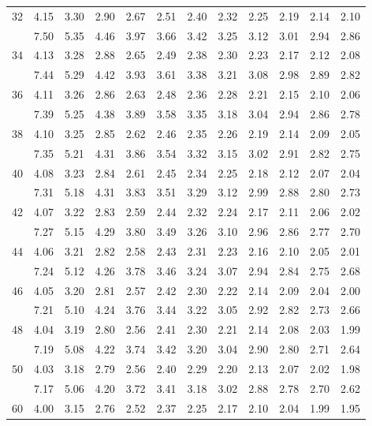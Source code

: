 \documentclass[lang=cn,10pt]{elegantbook}
\begin{document}
\begin{longtable}{c|ccccccccccc}
    32 & 4.15 & 3.30 & 2.90 & 2.67 & 2.51 & 2.40 & 2.32 & 2.25 & 2.19 & 2.14 & 2.10 \\
       & 7.50 & 5.35 & 4.46 & 3.97 & 3.66 & 3.42 & 3.25 & 3.12 & 3.01 & 2.94 & 2.86 \\
    34 & 4.13 & 3.28 & 2.88 & 2.65 & 2.49 & 2.38 & 2.30 & 2.23 & 2.17 & 2.12 & 2.08 \\
       & 7.44 & 5.29 & 4.42 & 3.93 & 3.61 & 3.38 & 3.21 & 3.08 & 2.98 & 2.89 & 2.82 \\
    36 & 4.11 & 3.26 & 2.86 & 2.63 & 2.48 & 2.36 & 2.28 & 2.21 & 2.15 & 2.10 & 2.06 \\
       & 7.39 & 5.25 & 4.38 & 3.89 & 3.58 & 3.35 & 3.18 & 3.04 & 2.94 & 2.86 & 2.78 \\
    38 & 4.10 & 3.25 & 2.85 & 2.62 & 2.46 & 2.35 & 2.26 & 2.19 & 2.14 & 2.09 & 2.05 \\
       & 7.35 & 5.21 & 4.31 & 3.86 & 3.54 & 3.32 & 3.15 & 3.02 & 2.91 & 2.82 & 2.75 \\
    40 & 4.08 & 3.23 & 2.84 & 2.61 & 2.45 & 2.34 & 2.25 & 2.18 & 2.12 & 2.07 & 2.04 \\
       & 7.31 & 5.18 & 4.31 & 3.83 & 3.51 & 3.29 & 3.12 & 2.99 & 2.88 & 2.80 & 2.73 \\
    42 & 4.07 & 3.22 & 2.83 & 2.59 & 2.44 & 2.32 & 2.24 & 2.17 & 2.11 & 2.06 & 2.02 \\
       & 7.27 & 5.15 & 4.29 & 3.80 & 3.49 & 3.26 & 3.10 & 2.96 & 2.86 & 2.77 & 2.70 \\
    44 & 4.06 & 3.21 & 2.82 & 2.58 & 2.43 & 2.31 & 2.23 & 2.16 & 2.10 & 2.05 & 2.01 \\
       & 7.24 & 5.12 & 4.26 & 3.78 & 3.46 & 3.24 & 3.07 & 2.94 & 2.84 & 2.75 & 2.68 \\
    46 & 4.05 & 3.20 & 2.81 & 2.57 & 2.42 & 2.30 & 2.22 & 2.14 & 2.09 & 2.04 & 2.00 \\
       & 7.21 & 5.10 & 4.24 & 3.76 & 3.44 & 3.22 & 3.05 & 2.92 & 2.82 & 2.73 & 2.66 \\
    48 & 4.04 & 3.19 & 2.80 & 2.56 & 2.41 & 2.30 & 2.21 & 2.14 & 2.08 & 2.03 & 1.99 \\
       & 7.19 & 5.08 & 4.22 & 3.74 & 3.42 & 3.20 & 3.04 & 2.90 & 2.80 & 2.71 & 2.64 \\
    50 & 4.03 & 3.18 & 2.79 & 2.56 & 2.40 & 2.29 & 2.20 & 2.13 & 2.07 & 2.02 & 1.98 \\
       & 7.17 & 5.06 & 4.20 & 3.72 & 3.41 & 3.18 & 3.02 & 2.88 & 2.78 & 2.70 & 2.62 \\
    60 & 4.00 & 3.15 & 2.76 & 2.52 & 2.37 & 2.25 & 2.17 & 2.10 & 2.04 & 1.99 & 1.95 \\

\end{longtable}
\end{document}
